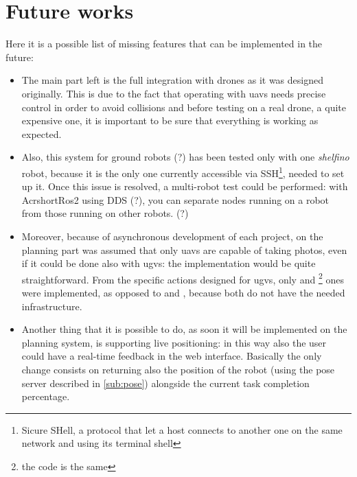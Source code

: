 \chapter{Future works}

Here it is a possible list of missing features that can be implemented in the future:

\begin{itemize}

\item The main part left is the full integration with drones as it was designed originally. This is due to the fact that operating with \Acrshort{uav}s needs precise control in order to avoid collisions and before testing on a real drone, a quite expensive one, it is important to be sure that everything is working as expected.

\item Also, this system for ground robots (?) has been tested only with one \textit{shelfino} robot, because it is the only one currently accessible via SSH\footnote{Sicure SHell, a protocol that let a host connects to another one on the same network and using its terminal shell}, needed to set up it. Once this issue is resolved, a multi-robot test could be performed: with Acrshort{Ros}2 using DDS (?), you can separate nodes running on a robot from those running on other robots. (?) %

\item Moreover, because of asynchronous development of each project, on the planning part was assumed that only \Acrshort{uav}s are capable of taking photos, even if it could be done also with \Acrshort{ugv}s: the implementation would be quite straightforward. From the specific actions designed for \Acrshort{ugv}s, only  and \footnote{the code is the same} ones were implemented, as opposed to  and , because both do not have the needed infrastructure.

\item Another thing that it is possible to do, as soon it will be implemented on the planning system, is supporting live positioning: in this way also the user could have a real-time feedback in the web interface. Basically the only change consists on returning also the position of the robot (using the pose server described in \autoref{sub:pose}) alongside the current task completion percentage.


\end{itemize}
